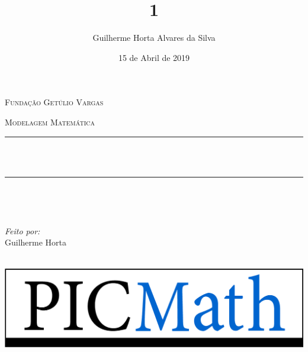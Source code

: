\documentclass[12pt]{report}
\title{1}
\author{Guilherme Horta Alvares da Silva}
\date{15 de Abril de 2019}
\makeatletter
\let\thetitle\@title
\makeatother
\begin{document}

\begin{titlepage}
	\centering
    \vspace*{0.5 cm}
   \begin{center}    \textsc{\Large   Fundação Getúlio Vargas}\\[2.0 cm]	\end{center}%
   \textsc{\Large Modelagem Matemática  }\\[0.5 cm]				%
	\rule{\linewidth}{0.2 mm} \\[0.4 cm]
	{ \huge \bfseries \thetitle}\\
	\rule{\linewidth}{0.2 mm} \\[1.5 cm]
	
	\begin{minipage}{0.4\textwidth}
		\begin{flushleft} \large
			\end{flushleft}
			\end{minipage}~
			\begin{minipage}{0.4\textwidth}
            
			\begin{flushright} \large
        \emph{Feito por:} \\
      Guilherme Horta 
		\end{flushright}
           
	\end{minipage}\\[2 cm]
	
  \includegraphics[scale = 0.5]{PICMathLogo.png}
    
    
    
    
	
\end{titlepage}
\end{document}
